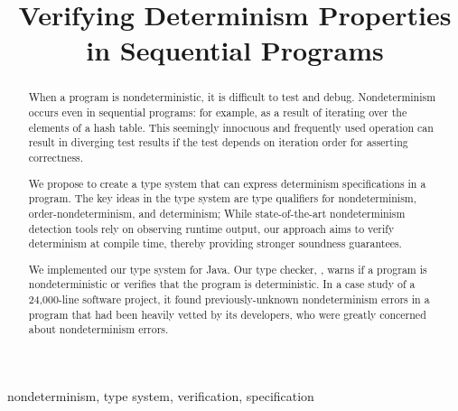 \documentclass[conference]{IEEEtran}
\begin{document}
\title{Verifying Determinism Properties in Sequential Programs}

\author{
}

\maketitle

\begin{abstract}
When a program is nondeterministic, it is difficult to test and debug.
Nondeterminism occurs even in sequential programs: for example, as a
result of iterating over the elements of a hash table. This seemingly innocuous and
frequently used operation can result in diverging test results
if the test depends on iteration order for asserting correctness.

We propose to create a type system that can express determinism specifications
in a program.
The key ideas in the type system are type qualifiers for nondeterminism,
order-nondeterminism, and determinism; While state-of-the-art
nondeterminism detection tools rely on observing runtime output, our approach
aims to verify determinism at compile time, thereby providing stronger soundness guarantees.

We implemented our type system for Java.
Our type checker, \theDeterminismChecker, warns if a
program is nondeterministic or verifies that the program is deterministic.
In a case study of a 24,000-line software project, it found
previously-unknown nondeterminism errors in a program that had been heavily
vetted by its developers,
who were greatly concerned about nondeterminism errors.
\end{abstract}

\begin{IEEEkeywords}
nondeterminism, type system, verification, specification
\end{IEEEkeywords}








\end{document}
